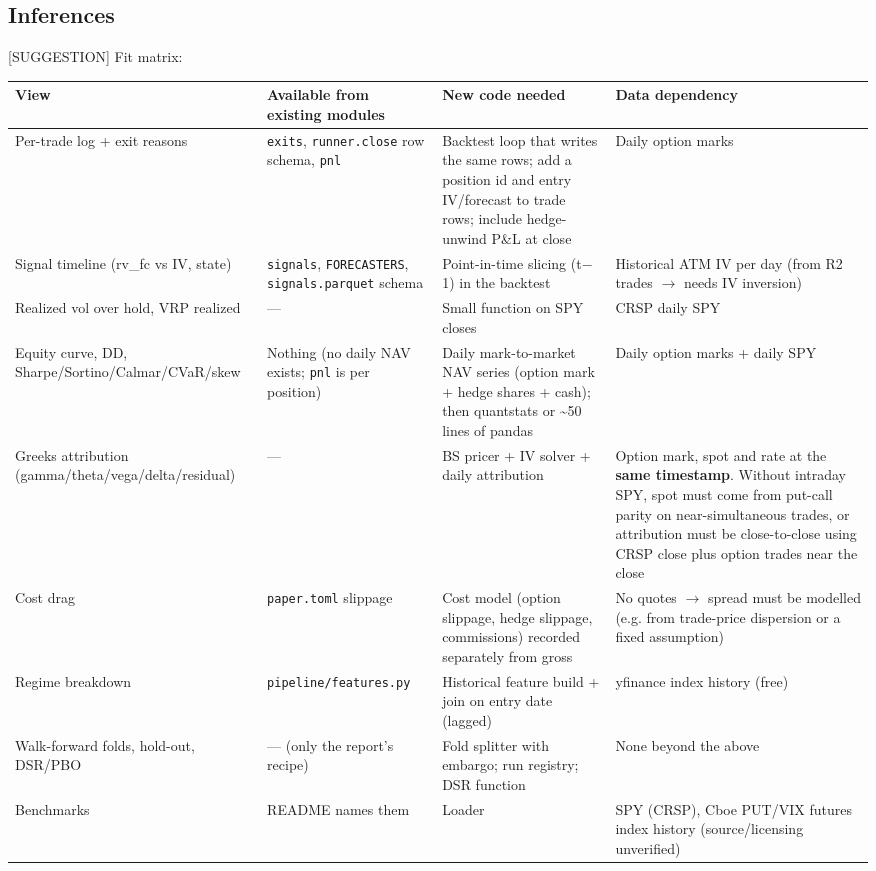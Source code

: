 \documentclass{article}
\begin{document}
\subsection{Inferences}

[SUGGESTION] Fit matrix:

\begin{center}\small
\begin{tabularx}{\linewidth}{>{\raggedright\arraybackslash}X >{\raggedright\arraybackslash}X >{\raggedright\arraybackslash}X >{\raggedright\arraybackslash}X}
\toprule
\textbf{View} & \textbf{Available from existing modules} & \textbf{New code needed} & \textbf{Data dependency} \\
\midrule
Per-trade log + exit reasons & \texttt{exits}, \texttt{runner.\allowbreak{}close} row schema, \texttt{pnl} & Backtest loop that writes the same rows; add a position id and entry IV/\allowbreak{}forecast to trade rows; include hedge-unwind P\&L at close & Daily option marks \\
Signal timeline (rv\_fc vs IV, state) & \texttt{signals}, \texttt{FORECASTERS}, \texttt{signals.\allowbreak{}parquet} schema & Point-in-time slicing (t\ensuremath{-}1) in the backtest & Historical ATM IV per day (from R2 trades \ensuremath{\rightarrow} needs IV inversion) \\
Realized vol over hold, VRP realized & --- & Small function on SPY closes & CRSP daily SPY \\
Equity curve, DD, Sharpe/\allowbreak{}Sortino/\allowbreak{}Calmar/\allowbreak{}CVaR/\allowbreak{}skew & Nothing (no daily NAV exists; \texttt{pnl} is per position) & Daily mark-to-market NAV series (option mark + hedge shares + cash); then quantstats or \textasciitilde{}50 lines of pandas & Daily option marks + daily SPY \\
Greeks attribution (gamma/\allowbreak{}theta/\allowbreak{}vega/\allowbreak{}delta/\allowbreak{}residual) & --- & BS pricer + IV solver + daily attribution & Option mark, spot and rate at the \textbf{same timestamp}. Without intraday SPY, spot must come from put-call parity on near-simultaneous trades, or attribution must be close-to-close using CRSP close plus option trades near the close \\
Cost drag & \texttt{paper.\allowbreak{}toml} slippage & Cost model (option slippage, hedge slippage, commissions) recorded separately from gross & No quotes \ensuremath{\rightarrow} spread must be modelled (e.g. from trade-price dispersion or a fixed assumption) \\
Regime breakdown & \texttt{pipeline/\allowbreak{}features.\allowbreak{}py} & Historical feature build + join on entry date (lagged) & yfinance index history (free) \\
Walk-forward folds, hold-out, DSR/\allowbreak{}PBO & --- (only the report's recipe) & Fold splitter with embargo; run registry; DSR function & None beyond the above \\
Benchmarks & README names them & Loader & SPY (CRSP), Cboe PUT/\allowbreak{}VIX futures index history (source/\allowbreak{}licensing unverified) \\
\bottomrule
\end{tabularx}
\end{center}
\end{document}

